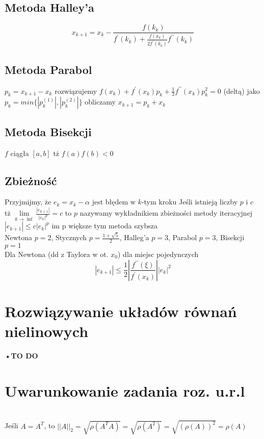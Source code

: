 \documentclass[twocolumn]{article}
\begin{document}
\begin{flushleft}
\subsection{Metoda Halley'a}
$$x_{k+1}=x_k-\frac{f(k_{k})}{f^{\prime}(k_k)+\frac{f(x_k)}{2f^\prime(k_{k})}f^{\prime \prime}(k_{k})}$$
\subsection{Metoda Parabol}
$p_k=x_{k+1}-x_k$ rozwiązujemy $f(x_k) + f^{\prime}(x_k)p_k+\frac{1}{2}f^{\prime \prime}(x_k)p_k^2=0$ (deltą) jako $p_k=min\{|p_k^{(1)}|,|p_k^{(2)}|\}$ obliczamy $x_{k+1}=p_k+x_k$
\subsection{Metoda Bisekcji}
$f$ ciągła $[a,b]$ tż $f(a)f(b) < 0$ 
\begin{algorithmic}
	\ELSE
	\ENDIF
\ENDFOR
\end{algorithmic}
\subsection{Zbieżność}
Przyjmijmy, że $e_k=x_k - \alpha$ jest błędem w $k$-tym kroku Jeśli istnieją liczby $p$ i $c$ tż $\underset{k \to \inf}{\lim}\frac{|e_{k+1}|}{|e_k|^p}=c$ to $p$ nazywamy wykładnikiem zbieżności metody iteracyjnej\\
$|e_{k+1}| \leq c|e_k|^p$ im p większe tym metoda szybsza\\
Newtona $p=2$, Stycznych $p=\frac{1+\sqrt{5}}{2}$, Halleg'a $p=3$, Parabol $p=3$, Bisekcji $p=1$\\
Dla Newtona (dd z Taylora w ot. $x_0$) dla miejsc pojedynczych
$$|e_{k+1}|\leq \frac{1}{2}\left| \frac{f^{\prime \prime}(\xi)}{f^{\prime}(x_k)}\right| |e_k|^2$$
\section{Rozwiązywanie układów równań nielinowych}
{\Large \textbf{•TO DO}}

\section{Uwarunkowanie zadania roz. u.r.l}
\\
Jeśli $A=A^T$, to $||A||_2 = \sqrt{\rho(A^TA)}=\sqrt{\rho(A^2)} =\sqrt{(\rho(A))^2}=\rho(A)$\\
\end{flushleft}
\end{document}
